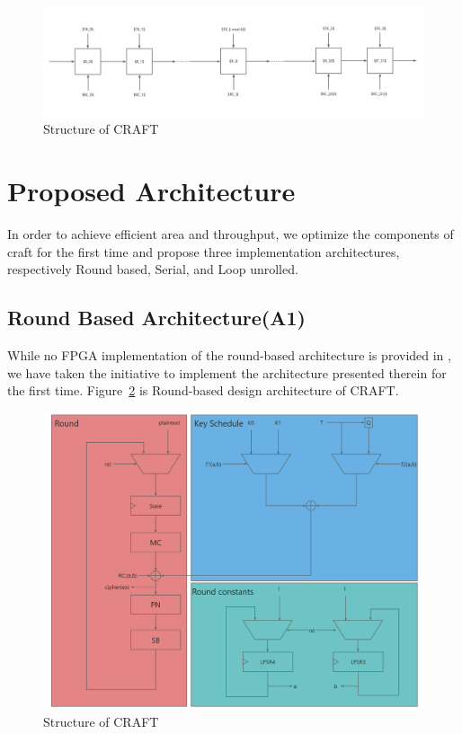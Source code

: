 \documentclass[sn-basic]{sn-jnl}%
\begin{document}
\begin{figure}[h]%
    \centering
    \includegraphics[width=\textwidth]{struct_of_craft.png}   
    \caption{Structure of CRAFT}\label{fig1}
\end{figure}


\section{Proposed Architecture}\label{sec3}

In order to achieve efficient area and throughput, we optimize the components of craft for the first time and propose three implementation architectures, respectively Round based, Serial, and Loop unrolled.

\subsection{Round Based Architecture(A1)}\label{subsec1}
While no FPGA implementation of the round-based architecture is provided in \cite{beierle2019craft}, we have taken the initiative to implement the architecture presented therein for the first time.
Figure~\ref{fig2} is Round-based design architecture of CRAFT.

\begin{figure}[h]%
    \centering
    \includegraphics[width=\textwidth]{round_based_design.png}
    \caption{Structure of CRAFT}\label{fig2}
\end{figure}
\end{document}
